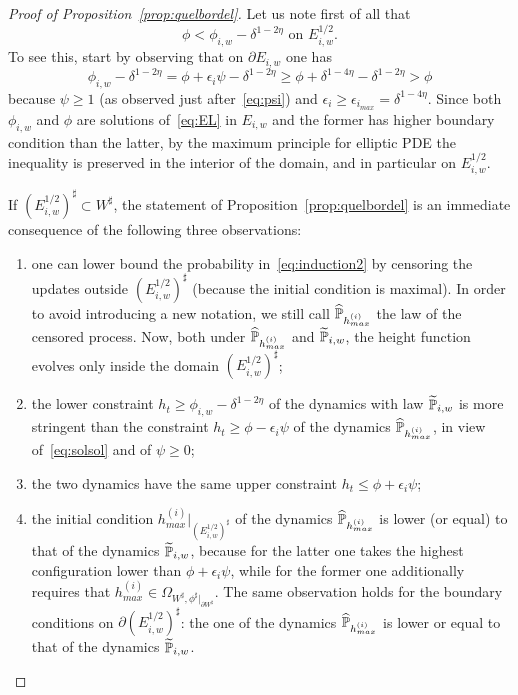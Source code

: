 \documentclass[10pt]{amsart}
\theoremstyle{definition}\newtheorem{defi}[theo]{Definition}\newtheorem{rema}[theo]{Remark}\newtheorem{exam}[theo]{Example}\newtheorem{exem}[theo]{Example}\newtheorem{nota}[theo]{Notation}
\renewcommand{\P}{\mathbb{P}}
\renewcommand{\d}{{\sharp }}
\newcommand*{\romanenumi}{\renewcommand*{\theenumi}{\roman{enumi}}}
\let\oldtilde\tilde
\renewcommand*{\tilde}[1]{\mathchoice{\widetilde{#1}}{\widetilde{#1}}{\oldtilde{#1}}{\oldtilde{#1}}}
\let\oldhat\hat
\renewcommand*{\hat}[1]{\mathchoice{\widehat{#1}}{\widehat{#1}}{\oldhat{#1}}{\oldhat{#1}}}
\begin{document}
\begin{proof}[Proof of Proposition~\ref{prop:quelbordel}]
Let us note first of all that
\begin{equation}\label{eq:solsol}
\phi< \phi_{i,w}-\delta^{1-2\eta} \text{ on } E^{1/2}_{i,w}.
\end{equation}
To see this, start by observing that on $\partial E_{i,w}$ one has
\begin{equation}\label{eq:psipsipsi}
\phi_{i,w}-\delta^{1-2\eta}=\phi+\epsilon_i \psi-\delta^{1-2\eta}\ge \phi+\delta^{1-4\eta}-\delta^{1-2\eta}>\phi
\end{equation}
because $\psi\ge 1$ (as observed just after~\eqref{eq:psi}) and $\epsilon_i\ge \epsilon_{i_{max}}=\delta^{1-4\eta}.$ Since both $\phi_{i,w}$ and $\phi$ are solutions of~\eqref{eq:EL} in $ E_{i,w}$ and the former has higher boundary condition than the latter, by the maximum principle for elliptic PDE the inequality is preserved in the interior of the domain, and in particular on $ E^{1/2}_{i,w}$.

If $(E^{1/2}_{i,w})^\d\subset W^\d$, the statement of Proposition~\ref{prop:quelbordel} is an immediate consequence of the following three observations:
\begin{enumerate}\romanenumi
\item one can lower bound the probability in~\eqref{eq:induction2} by censoring the updates outside $(E^{1/2}_{i,w})^\d$ (because the initial condition is maximal). In order to avoid introducing a new notation, we still call $\hat \P_{h^{(i)}_{max}}$ the law of the censored process. Now, both under $\hat \P_{h^{(i)}_{max}}$ and $\tilde\P_{i,w}$, the height function evolves only inside the domain $(E^{1/2}_{i,w})^\d$;

\item the lower constraint $h_t\ge \phi_{i,w}-\delta^{1-2\eta}$ of the dynamics with law $\tilde \P_{i,w}$ is more stringent than the constraint $h_t\ge \phi-\epsilon_i\psi$ of the dynamics $\hat \P_{h^{(i)}_{max}}$, in view of~\eqref{eq:solsol} and of $\psi\ge 0$;

\item the two dynamics have the same upper constraint $h_t\le \phi+\epsilon_i\psi$;
\item the initial condition $h^{(i)}_{max}|_{(E^{1/2}_{i,w})^\d}$ of the dynamics $\hat \P_{h^{(i)}_{max}}$ is lower (or equal) to that of the dynamics $\tilde \P_{i,w}$, because for the latter one takes the highest configuration lower than $\phi+\epsilon_i\psi$, while for the former one additionally requires that $h^{(i)}_{max}\in \Omega_{W^\d,\phi^\d|_{\partial W^\d}}$. The same observation holds for the boundary conditions on $\partial (E^{1/2}_{i,w})^\d$: the one of the dynamics $\hat \P_{h^{(i)}_{max}}$ is lower or equal to that of the dynamics $\tilde\P_{i,w}$.
\end{enumerate}


\end{proof}
\end{document}
